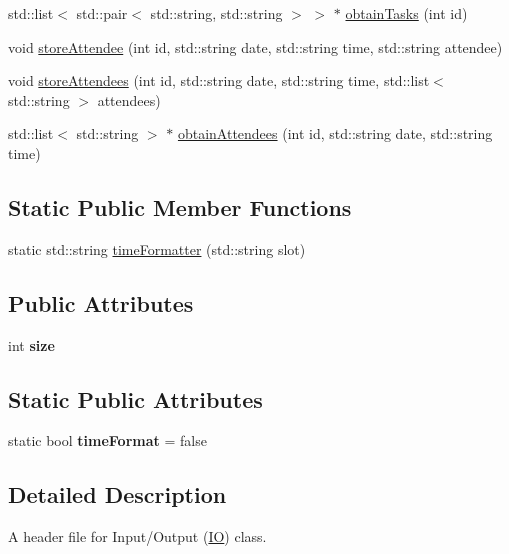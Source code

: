 \begin{DoxyCompactItemize}
\item 
std\+::list$<$ std\+::pair$<$ std\+::string, std\+::string $>$ $>$ $\ast$ \hyperlink{classIO_af2c5dffa84ae0741d41b0a3ccf5990ae}{obtain\+Tasks} (int id)
\item 
void \hyperlink{classIO_ae80862e6964e82c2f2e6d7f3b931f347}{store\+Attendee} (int id, std\+::string date, std\+::string time, std\+::string attendee)
\item 
void \hyperlink{classIO_ae1b8fcfab070b9af2dcd910c1cc7eb4e}{store\+Attendees} (int id, std\+::string date, std\+::string time, std\+::list$<$ std\+::string $>$ attendees)
\item 
std\+::list$<$ std\+::string $>$ $\ast$ \hyperlink{classIO_a6e49698e267ae002df56bde7875107b0}{obtain\+Attendees} (int id, std\+::string date, std\+::string time)
\end{DoxyCompactItemize}
\subsection*{Static Public Member Functions}
\begin{DoxyCompactItemize}
\item 
static std\+::string \hyperlink{classIO_ad78c42847c70915fe94bddd25f716859}{time\+Formatter} (std\+::string slot)
\end{DoxyCompactItemize}
\subsection*{Public Attributes}
\begin{DoxyCompactItemize}
\item 
int {\bfseries size}\hypertarget{classIO_a4e344c74454e6609b817e3fdb3fcddf3}{}\label{classIO_a4e344c74454e6609b817e3fdb3fcddf3}

\end{DoxyCompactItemize}
\subsection*{Static Public Attributes}
\begin{DoxyCompactItemize}
\item 
static bool {\bfseries time\+Format} = false\hypertarget{classIO_a04cf024687a6a86007db5ecfcab69e5c}{}\label{classIO_a04cf024687a6a86007db5ecfcab69e5c}

\end{DoxyCompactItemize}


\subsection{Detailed Description}
A header file for Input/\+Output (\hyperlink{classIO}{IO}) class. 

